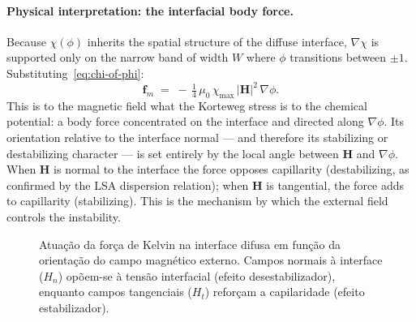 \paragraph{Physical interpretation: the interfacial body force.}
Because $\chi(\phi)$ inherits the spatial structure of the diffuse interface, $\nabla\chi$ is supported only on the narrow band of width $W$ where $\phi$ transitions between $\pm 1$.
Substituting~\eqref{eq:chi-of-phi}:
\begin{equation}
\bm{f}_m \;=\; -\,\tfrac{1}{4}\,\mu_0\,\chi_{\max}\,|\bm{H}|^{2}\,\nabla\phi.
\label{eq:fm-grad-phi}
\end{equation}
This is to the magnetic field what the Korteweg stress is to the chemical potential: a body force concentrated on the interface and directed along $\nabla\phi$.
Its orientation relative to the interface normal --- and therefore its stabilizing or destabilizing character --- is set entirely by the local angle between $\bm{H}$ and $\nabla\phi$.
When $\bm{H}$ is normal to the interface the force opposes capillarity (destabilizing, as confirmed by the LSA dispersion relation);
when $\bm{H}$ is tangential, the force adds to capillarity (stabilizing).
This is the mechanism by which the external field controls the instability.

\begin{figure}[H]
    \centering
    \caption{Atuação da força de Kelvin na interface difusa em função da orientação do campo magnético externo. Campos normais à interface ($H_n$) opõem-se à tensão interfacial (efeito desestabilizador), enquanto campos tangenciais ($H_t$) reforçam a capilaridade (efeito estabilizador).}
    \label{fig:diffuse-kelvin-force}
\end{figure}

